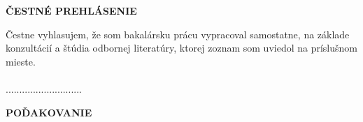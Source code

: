 
\newpage
\cleardoublepage
\thispagestyle{plain}
\vspace*{15cm} 
\begin{large}
\noindent
\textbf{ČESTNÉ PREHLÁSENIE} \\
\end{large}
\noindent
Čestne vyhlasujem, že som bakalársku prácu vypracoval samostatne, na základe
konzultácií a štúdia odbornej literatúry, ktorej zoznam som uviedol na príslušnom mieste.
\\
\vspace*{0.5cm}\\
\hspace*{10cm}............................\\
\hspace*{10.7cm} \Author


\newpage
\cleardoublepage
\thispagestyle{plain}
\begin{large}
	\noindent
	\textbf{POĎAKOVANIE} \\
\end{large}
\noindent

